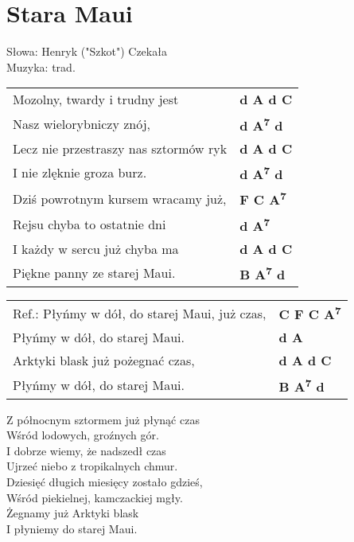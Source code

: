 \section{Stara Maui}

Słowa: Henryk ("Szkot") Czekała\\
Muzyka:  trad.

\vspace{2em}
\begin{tabular}{@{}p{9cm}@{}l@{}}
Mozolny, twardy i trudny jest & \bfseries  d A d C \\
Nasz wielorybniczy znój, & \bfseries  d A\textsuperscript{7} d \\
Lecz nie przestraszy nas sztormów ryk & \bfseries  d A d C \\
I nie zlęknie groza burz. & \bfseries  d A\textsuperscript{7} d \\
Dziś powrotnym kursem wracamy już, & \bfseries F C A\textsuperscript{7} \\
Rejsu chyba to ostatnie dni  & \bfseries  d A\textsuperscript{7} \\
I każdy w sercu już chyba ma & \bfseries d A d C \\
Piękne panny ze starej Maui. & \bfseries  B A\textsuperscript{7} d \\
\end{tabular}

\vspace{1em}
\begin{tabular}{@{}p{9cm}@{}l@{}}
Ref.: Płyńmy w dół, do starej Maui, już czas, & \bfseries  C F C A\textsuperscript{7} \\
Płyńmy w dół, do starej Maui. & \bfseries  d A \\
Arktyki blask już pożegnać czas, & \bfseries  d A d C \\
Płyńmy w dół, do starej Maui. & \bfseries  B A\textsuperscript{7} d \\
\end{tabular}

\vspace{1em}
Z północnym sztormem już płynąć czas \\
Wśród lodowych, groźnych gór. \\
I dobrze wiemy, że nadszedł czas \\
Ujrzeć niebo z tropikalnych chmur. \\
Dziesięć długich miesięcy zostało gdzieś, \\
Wśród piekielnej, kamczackiej mgły. \\
Żegnamy już Arktyki blask \\
I płyniemy do starej Maui. \\
\newpage

